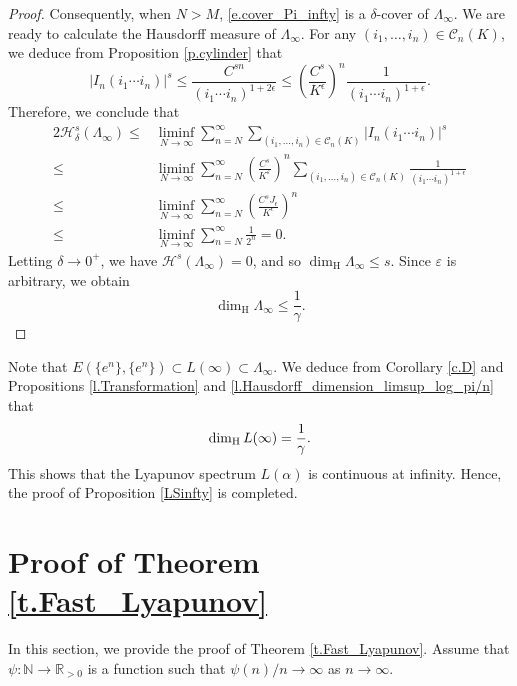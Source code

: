 \documentclass[12pt,reqno]{amsart}
\renewcommand{\=}{\coloneqq}
\theoremstyle{plain}
\begin{document}
\begin{proof}
 Consequently, when $N>M$, \eqref{e.cover_Pi_infty} is a $\delta$-cover of $\Lambda_{\infty}$. We are ready to calculate the Hausdorff measure of $\Lambda_{\infty}$. For any  $(i_1,\dots,i_{n})\in \mathcal{C}_n(K)$, we deduce from Proposition \ref{p.cylinder} that
 \[
  |I_n(i_1\cdots i_{n})|^s \leq \frac{C^{sn}}{(i_1\cdots i_{n})^{1+2\epsilon}} \leq \left(\frac{C^{s}}{K^\epsilon}\right)^n \frac{1}{(i_1\cdots i_{n})^{1+\epsilon}}.
 \]
Therefore, we conclude that
      \begin{alignat*}{2}
                \mathcal{H}_{\delta}^{s}(\Lambda_{\infty})
                \leq &\liminf_{N\to \infty}
                \sum_{n=N}^{\infty}\sum_{(i_1,\dots, i_{n})\in \mathcal{C}_{n}(K)}
                |I_n(i_1\cdots i_{n})|^s\\
                \leq& \liminf_{N\to \infty}
                \sum_{n=N}^{\infty}\left(\frac{C^{s}}{K^\varepsilon}\right)^n
                \sum_{(i_1,\dots, i_{n})\in \mathcal{C}_{n}(K)}
                \frac{1}{(i_1\cdots i_{n})^{1+\epsilon}}\\
                \leq& \liminf_{N\to \infty}\sum_{n=N}^{\infty}
                \left(\frac{C^sJ_{\epsilon}}{K^{\epsilon}}\right)^{n}\\
                \leq& \liminf_{N\to \infty}\sum_{n=N}^{\infty}
                \frac{1}{2^n}=0.
        \end{alignat*}
Letting $\delta \to 0^{+}$, we have $\mathcal{H}^{s}(\Lambda_{\infty})=0$, and so $\dim_{\text{H}}\Lambda_{\infty}\leq s$. Since $\varepsilon$ is arbitrary, we obtain $$\dim_{\text{H}} \Lambda_{\infty} \leq \frac{1}{\gamma}.$$
\end{proof}

Note that $E(\{e^n\},\{e^n\}) \subset L(\infty) \subset \Lambda_\infty$. We deduce from Corollary \ref{c.D} and Propositions \ref{l.Transformation} and \ref{l.Hausdorff_dimension_limsup_log_pi/n} that
\[
\dim_{\rm H}L(\infty) = \frac{1}{\gamma}.
\]
This shows that the Lyapunov spectrum $L(\alpha)$ is continuous at infinity. Hence, the proof of Proposition \ref{LSinfty} is completed.



\section{Proof of Theorem \ref{t.Fast_Lyapunov}}\label{s.proofoftheorema}

In this section, we provide the proof of Theorem \ref{t.Fast_Lyapunov}.
Assume that $\psi:\mathbb{N}\to\mathbb{R}_{>0}$ is a function such that $\psi(n)/n \to \infty$ as $n\to \infty$.
\end{document}
